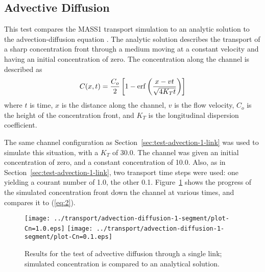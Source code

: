 \documentclass[12pt,dvips,letterpaper]{article}
\begin{document}
\subsection{Advective Diffusion}
\label{sec:test-advection-diffusion-1-link}

This test compares the MASS1 transport simulation to an analytic
solution to the advection-diffusion equation \citep[][\S~2.4]{Fis79}.
The analytic solution describes the transport of a sharp concentration
front through a medium moving at a constant velocity and having an
initial concentration of zero.  The concentration along the channel is
described as
\begin{equation}
  \label{eq:2}
  C(x,t) = { { C_{o} } \over 2 } \left[ { 1 - \mathrm{erf} \left( { { x - vt } 
          \over { \sqrt{4 K_{T} t} } } \right) } \right]
\end{equation}
where $t$ is time, $x$ is the distance along the channel, $v$ is the
flow velocity, $C_{o}$ is the height of the concentration front, and
$K_{T}$ is the longitudinal dispersion coefficient.  

The same channel configuration as
Section~\ref{sec:test-advection-1-link} was used to simulate this
situation, with a $K_{T}$ of 30.0.  The channel was given an initial
concentration of zero, and a constant concentration of 10.0. Also, as
in Section~\ref{sec:test-advection-1-link}, two transport time steps
were used: one yielding a courant number of 1.0, the other 0.1.
Figure~\ref{fig:test-advection-diffusion-1-results} shows the progress
of the simulated concentration front down the channel at various
times, and compares it to (\ref{eq:2}).


\begin{figure}[htbp]
  \begin{center}
    \texttt{[image: ../transport/advection-diffusion-1-segment/plot-Cn=1.0.eps]}
    \texttt{[image: ../transport/advection-diffusion-1-segment/plot-Cn=0.1.eps]}
    \caption{Results for the test of advective diffusion through a single link;
      simulated concentration is compared to an analytical solution.}
    \label{fig:test-advection-diffusion-1-results}
  \end{center}
\end{figure}


\end{document}
